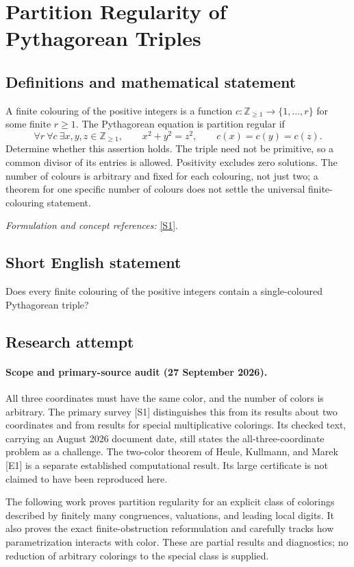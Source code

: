 \documentclass[11pt]{article}
\begin{document}
\section*{\texorpdfstring{Partition Regularity of Pythagorean Triples}{Partition Regularity of Pythagorean Triples}}\label{381}
\subsection{Definitions and mathematical statement}
A finite colouring of the positive integers is a function $c:{\mathbb{Z}}_{\ge1}\to\{1,\ldots,r\}$ for some finite $r\ge1$. The Pythagorean equation is partition regular if
\[
 \forall r\ \forall c\ \exists x,y,z\in{\mathbb{Z}}_{\ge1},
 \qquad x^2+y^2=z^2,
 \qquad c(x)=c(y)=c(z).
\]
Determine whether this assertion holds. The triple need not be primitive, so a common divisor of its entries is allowed. Positivity excludes zero solutions. The number of colours is arbitrary and fixed for each colouring, not just two; a theorem for one specific number of colours does not settle the universal finite-colouring statement.
\par\smallskip\textit{Formulation and concept references:} \href{https://arxiv.org/abs/2411.17523}{[S1]}.

\subsection{Short English statement}
Does every finite colouring of the positive integers contain a single-coloured Pythagorean triple?
\subsection{Research attempt}
\paragraph{Scope and primary-source audit (27 September 2026).}
All three coordinates must have the same color, and the number of colors is arbitrary. The primary survey [S1] distinguishes this from its results about two coordinates and from results for special multiplicative colorings. Its checked text, carrying an August 2026 document date, still states the all-three-coordinate problem as a challenge. The two-color theorem of Heule, Kullmann, and Marek [E1] is a separate established computational result. Its large certificate is not claimed to have been reproduced here.

The following work proves partition regularity for an explicit class of colorings described by finitely many congruences, valuations, and leading local digits. It also proves the exact finite-obstruction reformulation and carefully tracks how parametrization interacts with color. These are partial results and diagnostics; no reduction of arbitrary colorings to the special class is supplied.
\end{document}
